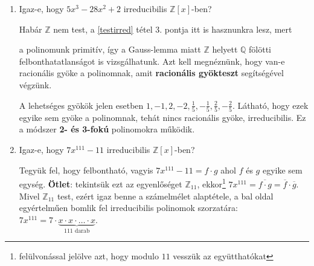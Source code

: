 \documentclass[12pt]{book}
\theoremstyle{plain} %
\theoremstyle{definition} %
\theoremstyle{remark}
\numberwithin{equation}{section}  %
\begin{document}
	\begin{enumerate}
		\item {Igaz-e, hogy $5x^3-28x^2+2$ irreducibilis $\mathbb{Z}[x]$-ben?
			
		Habár $\mathbb{Z}$ nem test, a \ref{testirred} tétel 3. pontja itt is hasznunkra lesz, mert 

		a polinomunk primitív, így a Gauss-lemma miatt $\mathbb{Z}$ helyett $\mathbb{Q}$ fölötti felbonthatatlanságot is vizsgálhatunk. Azt kell megnéznünk, hogy van-e racionális gyöke a polinomnak, amit \textbf{racionális gyökteszt} segítségével végzünk. 
		
		A lehetséges gyökök jelen esetben $1,-1,2,-2,\frac{1}{5},-\frac{1}{5},\frac{2}{5},-\frac{2}{5}$. Látható, hogy ezek egyike sem gyöke a polinomnak, tehát nincs racionális gyöke, irreducibilis. Ez a módszer \textbf{2- és 3-fokú} polinomokra működik. 
		}
		\item{Igaz-e, hogy $7x^{111}-11$ irreducibilis $\mathbb{Z}[x]$-ben?
			
		Tegyük fel, hogy felbontható, vagyis $7x^{111}-11=f\cdot g$ ahol $f$ és $g$ egyike sem egység. \textbf{Ötlet}: tekintsük ezt az egyenlőséget $\mathbb{Z}_{11}$, ekkor\footnote{felülvonással jelölve azt, hogy modulo $11$ vesszük az együtthatókat} $7x^{111}=\overline{f\cdot g}=\overline{f}\cdot \overline{g}$. Mivel $\mathbb{Z}_{11}$ test, ezért igaz benne a számelmélet alaptétele, a bal oldal egyértelműen bomlik fel irreducibilis polinomok szorzatára: $7x^{111}=7 \cdot \underbrace{ x\cdot x \cdot \ldots \cdot x}_{111 \text{ darab}}$.
		
}
\end{enumerate}
\end{document}
